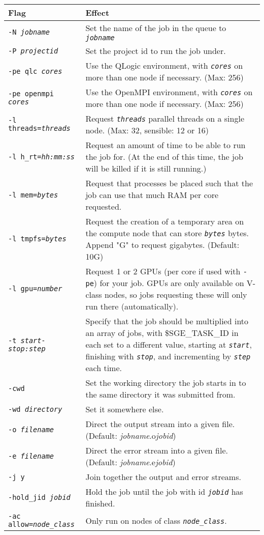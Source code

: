 \documentclass[landscape,a4paper]{article}
\renewcommand{\th}[1]{\textbf{#1}}
\newcommand{\code}[1]{\texttt{#1}}
\newcommand{\codeit}[1]{\texttt{\color{SchemeColour}\emph{#1}}}
\begin{document}
\begin{multicols}{3}
{\small \centering
\begin{tabular}{p{2.5cm}p{5cm}}
\hline
\th{Flag} & \th{Effect}\\
\hline
\code{-N }\codeit{jobname} &
Set the name of the job in the queue to \codeit{jobname}
\\
\code{-P }\codeit{projectid} &
Set the project id to run the job under.
\\
\code{-pe qlc }\codeit{cores} & 
Use the QLogic environment, with \codeit{cores} on more than one node if necessary. (Max: 256)
\\
\code{-pe openmpi }\codeit{cores} &
Use the OpenMPI environment, with \codeit{cores} on more than one node if necessary. (Max: 256)
\\
\code{-l threads=}\codeit{threads} &
Request \codeit{threads} parallel threads on a single node. (Max: 32, sensible: 12 or 16)
\\
\code{-l h\_rt=}\codeit{hh:mm:ss} & 
Request an amount of time to be able to run the job for. (At the end of this time, the job will be killed if it is still running.)
\\
\code{-l mem=}\codeit{bytes} & 
Request that processes be placed such that the job can use that much RAM per core requested.
\\
\code{-l tmpfs=}\codeit{bytes} & 
Request the creation of a temporary area on the compute node that can store \codeit{bytes} bytes. Append "G" to request gigabytes. (Default: 10G)
\\
\code{-l gpu=}\codeit{number} &
Request 1 or 2 GPUs (per core if used with \code{-pe}) for your job. GPUs are only available on V-class nodes, so jobs requesting these will only run there (automatically).
\\ 
\code{-t }\codeit{start-stop:step} & 
Specify that the job should be multiplied into an array of jobs, with \$SGE\_TASK\_ID in each set to a different value, starting at \codeit{start}, finishing with \codeit{stop}, and incrementing by \codeit{step} each time.
\\
\code{-cwd} & 
Set the working directory the job starts in to the same directory it was submitted from.
\\
\code{-wd }\codeit{directory} & 
Set it somewhere else.
\\
\code{-o }\codeit{filename} & 
Direct the output stream into a given file. (Default: \textit{jobname}.o\textit{jobid})
\\
\code{-e }\codeit{filename} & 
Direct the error stream into a given file. (Default: \textit{jobname}.e\textit{jobid})
\\
\code{-j y} & 
Join together the output and error streams.
\\
\code{-hold\_jid }\codeit{jobid} & 
Hold the job until the job with id \codeit{jobid} has finished.
\\
\code{-ac allow=}\codeit{node\_class} & 
Only run on nodes of class \codeit{node\_class}.
\\
\hline
\end{tabular}
}


\end{multicols}
\end{document}
